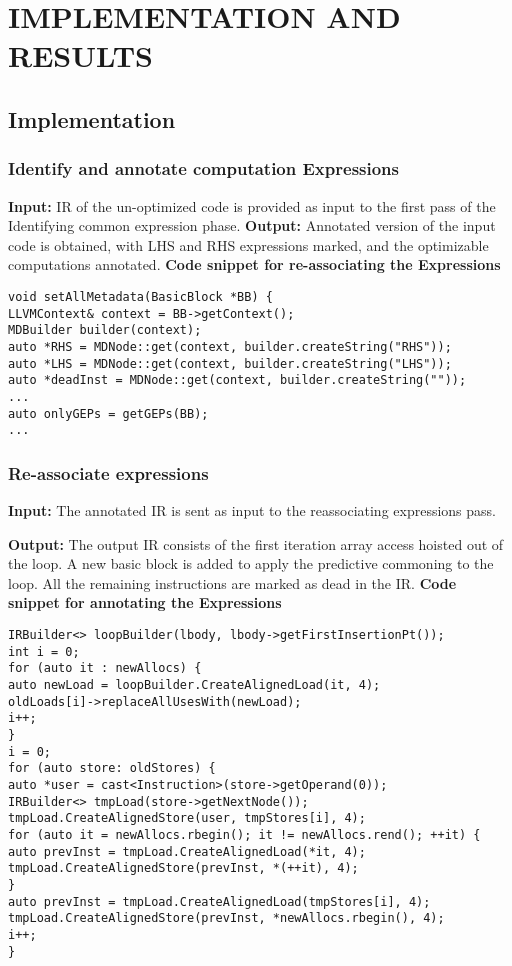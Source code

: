 
\chapter{IMPLEMENTATION AND RESULTS} %

\section{Implementation}
\subsection{Identify and annotate computation Expressions}
\noindent
\textbf{Input: }
IR of the un-optimized code is provided as input to the first pass of the Identifying common expression phase.\newline
\hspace{35pt}\textbf{Output: }
Annotated version of the input code is obtained, with LHS and RHS expressions marked, and the optimizable computations annotated.\newline
\textbf{Code snippet for re-associating the Expressions}

\begin{lstlisting}
void setAllMetadata(BasicBlock *BB) {
LLVMContext& context = BB->getContext();
MDBuilder builder(context);
auto *RHS = MDNode::get(context, builder.createString("RHS"));
auto *LHS = MDNode::get(context, builder.createString("LHS"));
auto *deadInst = MDNode::get(context, builder.createString(""));
...
auto onlyGEPs = getGEPs(BB);
...
\end{lstlisting}
\newpage

\subsection{Re-associate expressions}
\noindent
\textbf{Input:} 
The annotated IR is sent as input to the reassociating expressions pass.

\noindent
\textbf{Output:}
The output IR consists of the first iteration array access hoisted out of the loop. A new basic block is added to apply the predictive commoning to the loop. All the remaining instructions are marked as dead in the IR.\newline
\textbf{Code snippet for annotating the Expressions}
\begin{lstlisting}
IRBuilder<> loopBuilder(lbody, lbody->getFirstInsertionPt());
int i = 0;
for (auto it : newAllocs) {
auto newLoad = loopBuilder.CreateAlignedLoad(it, 4);
oldLoads[i]->replaceAllUsesWith(newLoad);
i++;
}
i = 0;
for (auto store: oldStores) {
auto *user = cast<Instruction>(store->getOperand(0));
IRBuilder<> tmpLoad(store->getNextNode());
tmpLoad.CreateAlignedStore(user, tmpStores[i], 4);
for (auto it = newAllocs.rbegin(); it != newAllocs.rend(); ++it) {
auto prevInst = tmpLoad.CreateAlignedLoad(*it, 4);
tmpLoad.CreateAlignedStore(prevInst, *(++it), 4);
}
auto prevInst = tmpLoad.CreateAlignedLoad(tmpStores[i], 4);
tmpLoad.CreateAlignedStore(prevInst, *newAllocs.rbegin(), 4);
i++;
}

\end{lstlisting}

